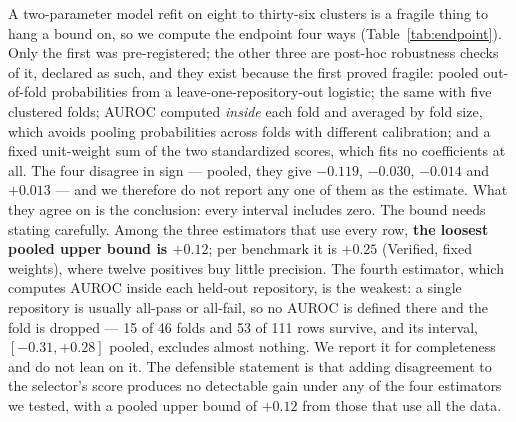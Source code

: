\documentclass[11pt]{article}
\begin{document}
A two-parameter model refit on eight to thirty-six clusters is a fragile thing to hang a bound on, so we compute the endpoint four ways (Table~\ref{tab:endpoint}). Only the first was pre-registered; the other three are post-hoc robustness checks of it, declared as such, and they exist because the first proved fragile: pooled out-of-fold probabilities from a leave-one-repository-out logistic; the same with five clustered folds; AUROC computed \emph{inside} each fold and averaged by fold size, which avoids pooling probabilities across folds with different calibration; and a fixed unit-weight sum of the two standardized scores, which fits no coefficients at all. The four disagree in sign --- pooled, they give $-0.119$, $-0.030$, $-0.014$ and $+0.013$ --- and we therefore do not report any one of them as the estimate. What they agree on is the conclusion: every interval includes zero. The bound needs stating carefully. Among the three estimators that use every row, \textbf{the loosest pooled upper bound is $+0.12$}; per benchmark it is $+0.25$ (Verified, fixed weights), where twelve positives buy little precision. The fourth estimator, which computes AUROC inside each held-out repository, is the weakest: a single repository is usually all-pass or all-fail, so no AUROC is defined there and the fold is dropped --- 15 of 46 folds and 53 of 111 rows survive, and its interval, $[-0.31, +0.28]$ pooled, excludes almost nothing. We report it for completeness and do not lean on it. The defensible statement is that adding disagreement to the selector's score produces no detectable gain under any of the four estimators we tested, with a pooled upper bound of $+0.12$ from those that use all the data.
\end{document}
